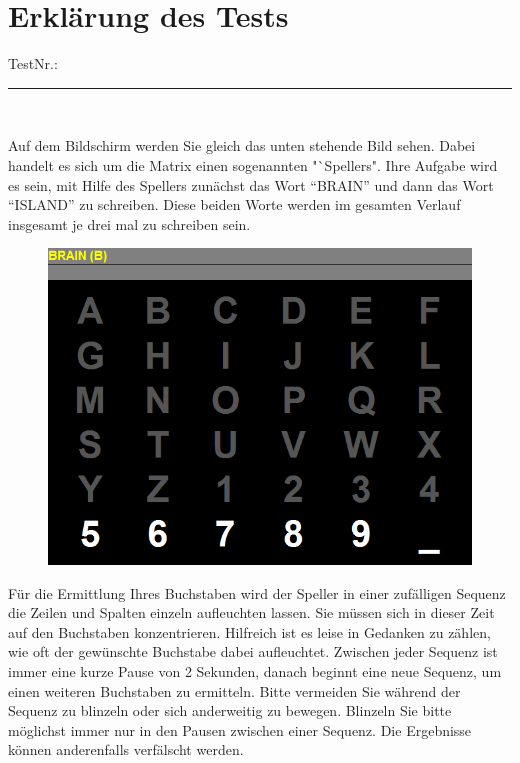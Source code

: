 \documentclass[12pt,fleqn]{scrreprt}
\begin{document}
\pagebreak
\section*{Erklärung des Tests}
\line
TestNr.: \rule{1cm}{.1pt} \\
\vspace{1cm}

Auf dem Bildschirm werden Sie gleich das unten stehende Bild sehen.
Dabei handelt es sich um die Matrix einen sogenannten "`Spellers".
Ihre Aufgabe wird es sein, mit Hilfe des Spellers zunächst das Wort "`BRAIN"' und dann das Wort "`ISLAND"' zu schreiben.
Diese beiden Worte werden im gesamten Verlauf insgesamt je drei mal zu schreiben sein.\\

\begin{figure}[h!]
\begin{center}
\includegraphics[scale=0.6]{images/speller.png}
\label{speller}
\end{center}
\end{figure}

Für die Ermittlung Ihres Buchstaben wird der Speller in einer zufälligen Sequenz die Zeilen und Spalten einzeln aufleuchten lassen.
Sie müssen sich in dieser Zeit auf den Buchstaben konzentrieren.
Hilfreich ist es leise in Gedanken zu zählen, wie oft der gewünschte Buchstabe dabei aufleuchtet.
Zwischen jeder Sequenz ist immer eine kurze Pause von 2 Sekunden, danach beginnt eine neue Sequenz, um einen weiteren Buchstaben zu ermitteln.
Bitte vermeiden Sie während der Sequenz zu blinzeln oder sich anderweitig zu bewegen. 
Blinzeln Sie bitte möglichst immer nur in den Pausen zwischen einer Sequenz.
Die Ergebnisse können anderenfalls verfälscht werden.\\
\end{document}
